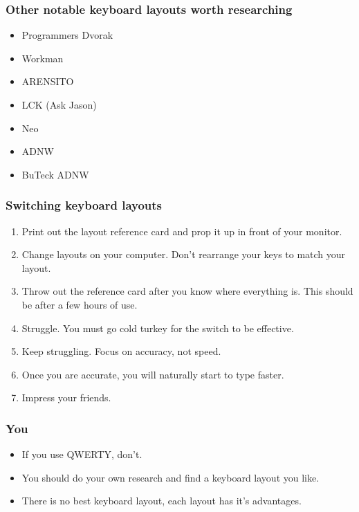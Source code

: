 \documentclass{beamer}
\begin{document}
\begin{frame}
    \frametitle{Other notable keyboard layouts worth researching}
    \begin{itemize}[<+->]
        \item Programmers Dvorak
        \item Workman
        \item ARENSITO
        \item LCK (Ask Jason)
        \item Neo
        \item ADNW
        \item BuTeck ADNW
    \end{itemize}
\end{frame}

\begin{frame}
    \frametitle{Switching keyboard layouts}
    \begin{enumerate}[<+->]
        \item Print out the layout reference card and prop it up in front of
            your monitor.
        \item Change layouts on your computer. Don't rearrange your keys to
            match your layout.
        \item Throw out the reference card after you know where everything is.
            This should be after a few hours of use.
        \item Struggle. You must go cold turkey for the switch to be effective.
        \item Keep struggling. Focus on accuracy, not speed.
        \item Once you are accurate, you will naturally start to type faster.
        \item Impress your friends.
    \end{enumerate}
\end{frame}

\begin{frame}
    \frametitle{You}
    \begin{itemize}[<+->]
        \item If you use QWERTY, don't.
        \item You should do your own research and find a keyboard layout you
            like.
        \item There is no best keyboard layout, each layout has it's
            advantages.
    \end{itemize}
\end{frame}
\end{document}
